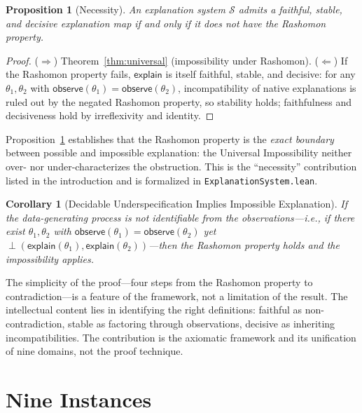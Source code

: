 \documentclass{article}
\newtheorem{corollary}{Corollary}
\newtheorem{proposition}{Proposition}
\newcommand{\incomp}{\perp}                  %
\begin{document}
\begin{proposition}[Necessity]
\label{prop:necessity}
An explanation system $\mathcal{S}$ admits a faithful, stable, and decisive
explanation map if and only if it does \emph{not} have the Rashomon property.
\end{proposition}

\begin{proof}
($\Rightarrow$) Theorem~\ref{thm:universal} (impossibility under Rashomon).
($\Leftarrow$) If the Rashomon property fails, $\mathsf{explain}$ is itself
faithful, stable, and decisive: for any $\theta_1, \theta_2$ with
$\mathsf{observe}(\theta_1) = \mathsf{observe}(\theta_2)$, incompatibility
of native explanations is ruled out by the negated Rashomon property, so
stability holds; faithfulness and decisiveness hold by irreflexivity and
identity.
\end{proof}

\noindent
Proposition~\ref{prop:necessity} establishes that the Rashomon property is
the \emph{exact boundary} between possible and impossible explanation:
the Universal Impossibility neither over- nor under-characterizes the
obstruction.  This is the ``necessity'' contribution listed in the
introduction and is formalized in \texttt{ExplanationSystem.lean}.

\begin{corollary}[Decidable Underspecification Implies Impossible Explanation]
\label{cor:decidable}
If the data-generating process is not identifiable from the
observations---i.e., if there exist $\theta_1, \theta_2$ with
$\mathsf{observe}(\theta_1) = \mathsf{observe}(\theta_2)$ yet
$\incomp(\mathsf{explain}(\theta_1), \mathsf{explain}(\theta_2))$---then
the Rashomon property holds and the impossibility applies.
\end{corollary}

\noindent
The simplicity of the proof---four steps from the Rashomon property to
contradiction---is a feature of the framework, not a limitation of the
result. The intellectual content lies in identifying the right
definitions: faithful as non-contradiction, stable as factoring through
observations, decisive as inheriting incompatibilities. The
contribution is the axiomatic framework and its unification of nine
domains, not the proof technique.

\section{Nine Instances}
\label{sec:instances}
\end{document}
